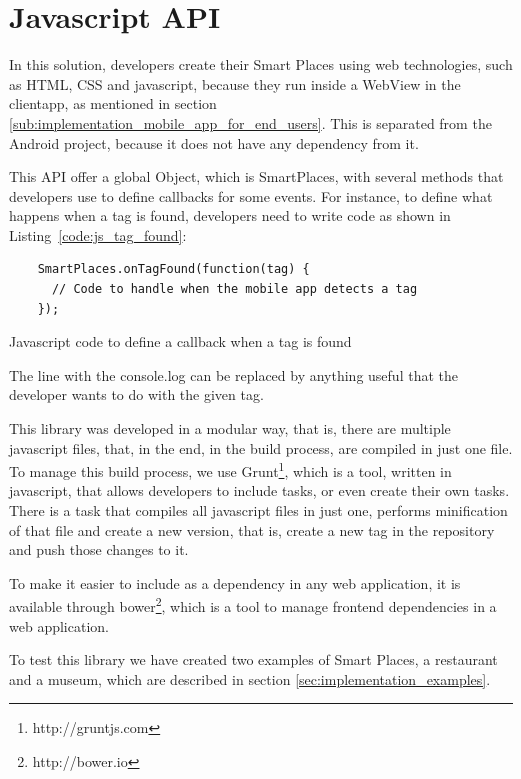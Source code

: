 \section{Javascript API}
\label{sec:javascript_api}
In this solution, developers create their Smart Places using web technologies, such as \gls{HTML}, \gls{CSS} and javascript, because they run inside a WebView in the clientapp, as mentioned in section \ref{sub:implementation_mobile_app_for_end_users}.
This is separated from the Android project, because it does not have any dependency from it.

This \gls{API} offer a global Object, which is SmartPlaces, with several methods that developers use to define callbacks for some events. For instance, to define what happens when a tag is found, developers need to write code as shown in Listing~\ref{code:js_tag_found}:

\begin{listing}[H]
  \begin{verbatim}
    SmartPlaces.onTagFound(function(tag) {
      // Code to handle when the mobile app detects a tag
    });
  \end{verbatim}
  \caption[Tag found]{Javascript code to define a callback when a tag is found}
  \label{code:js_tag_found}
\end{listing}

The line with the console.log can be replaced by anything useful that the developer wants to do with the given tag.

This library was developed in a modular way, that is, there are multiple javascript files, that, in the end, in the build process, are compiled in just one file.
To manage this build process, we use Grunt\footnote{http://gruntjs.com}, which is a tool, written in javascript, that allows developers to include tasks, or even create their own tasks. There is a task that compiles all javascript files in just one, performs minification of that file and create a new version, that is, create a new tag in the repository and push those changes to it.

To make it easier to include as a dependency in any web application, it is available through bower\footnote{http://bower.io}, which is a tool to manage frontend dependencies in a web application.

To test this library we have created two examples of Smart Places, a restaurant and a museum, which are described in section \ref{sec:implementation_examples}.

